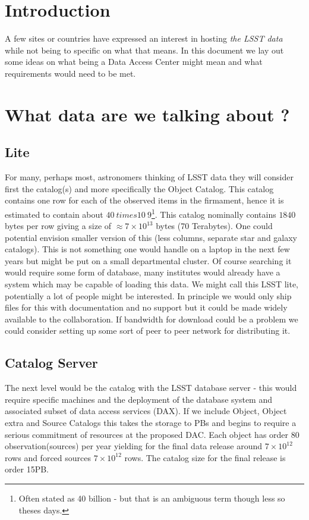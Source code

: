 
\section{Introduction}

A few sites or countries have expressed an interest in hosting {\em the LSST data} while not being to specific on what that means.
In this document we lay out some ideas on what being a Data Access Center might mean and what requirements would need to be met.


\section{What data are we talking about ?}

\subsection{Lite}
For many, perhaps most, astronomers thinking of LSST data they will consider first the catalog(s) and more specifically the Object Catalog.
This catalog contains one row for each of the observed items in the firmament, hence it is estimated to contain about $40 ~times 10~{9}$\footnote{Often stated as 40 billion - but that is an ambiguous term though less so theses days.}. This catalog nominally contains $1840$ bytes per row giving a size of $\approx 7 \times 10^{13}$ bytes (70 Terabytes). One could potential envision smaller version of this (less columns, separate star and galaxy catalogs). This is not something one would handle on a laptop in the next few years but might be put on a small departmental cluster.
Of course searching it would require some form of database, many institutes would already have a system which may be capable of loading this data.
We might call this LSST lite, potentially a lot of people might be interested. In principle we would only ship files for this with documentation and no support but it could be made widely available to the collaboration. If bandwidth for download could be a problem we could consider setting up some sort of peer to peer network for distributing it.

\subsection{Catalog Server}
The next level would be the catalog with the LSST database server - this would require specific machines and the deployment of the database system and associated subset of data access services (DAX). If we include Object, Object extra and Source Catalogs this takes the storage to PBs and begins to require a serious commitment of resources at the proposed DAC. Each object has order 80 observation(sources) per year yielding for the final data release around $7 \times 10^{12} $ rows and forced sources $7 \times 10^{12}$ rows.  The catalog size for the final release is order 15PB.

